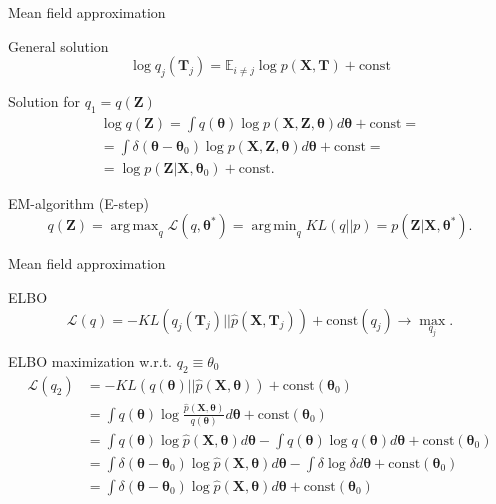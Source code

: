 \documentclass{beamer}
\newcommand{\bT}{\mathbf{T}}
\newcommand{\bX}{\mathbf{X}}
\newcommand{\bZ}{\mathbf{Z}}
\newcommand{\btheta}{\boldsymbol{\theta}}
\DeclareMathOperator*{\argmin}{arg\,min}
\DeclareMathOperator*{\argmax}{arg\,max}
\begin{document}
\begin{frame}{Mean field approximation}
	\begin{block}{General solution}
		\vspace{-0.3cm}
		\[
		\log q_j(\bT_j) = \mathbb{E}_{i \neq j} \log p(\bX, \bT) + \text{const}
		\]
		\vspace{-0.3cm}
	\end{block}
	\begin{block}{Solution for $q_1 = q(\bZ)$}
		\vspace{-0.3cm}
		\begin{multline*}
			\log q(\bZ) = \int q(\btheta) \log p(\bX, \bZ,  \btheta) d\btheta + \text{const} = \\
			= \int \delta(\btheta - \btheta_0) \log p(\bX, \bZ,  \btheta) d\btheta + \text{const} = \\
			= \log p (\bZ | \bX, \btheta_0) +  \text{const}.
		\end{multline*}
	\end{block}
	\vspace{-0.3cm}
	\begin{block}{EM-algorithm (E-step)}
		\vspace{-0.3cm}
	\[
		q(\bZ) = \argmax_q \mathcal{L} (q, \btheta^*) = \argmin_q KL(q || p) = p(\bZ| \bX, \btheta^*).
	\]
	\end{block}
\end{frame}
\begin{frame}{Mean field approximation}
	\begin{block}{ELBO}
		\[
			\mathcal{L} (q) = - KL (q_j(\bT_j) || \hat{p}(\bX, \bT_j))  + \text{const}(q_j) \rightarrow \max_{q_j}.
		\]
	\vspace{-0.3cm}
	\end{block}
	\begin{block}{ELBO maximization w.r.t. $q_2 \equiv \theta_0$}
		\vspace{-0.3cm}
		\begin{align*}
			\mathcal{L} (q_2) &= - KL (q(\btheta) || \hat{p}(\bX, \btheta))  + \text{const}(\btheta_0) \\ 
			&= \int q (\btheta) \log \frac{\hat{p}(\bX, \btheta)}{q(\btheta)} d\btheta + \text{const}(\btheta_0) \\
			& = \int q (\btheta) \log \hat{p}(\bX, \btheta) d\btheta  - \int q (\btheta) \log q(\btheta) d\btheta + \text{const}(\btheta_0) \\
			& = \int \delta(\btheta - \btheta_0) \log \hat{p}(\bX, \btheta) d\btheta  - \int \delta \log \delta d\btheta + \text{const}(\btheta_0) \\ 
			& = \int \delta(\btheta - \btheta_0) \log \hat{p}(\bX, \btheta) d\btheta + \text{const}(\btheta_0) 
		\end{align*}
		\vspace{-0.3cm}
	\end{block}
\end{frame}
\end{document}
